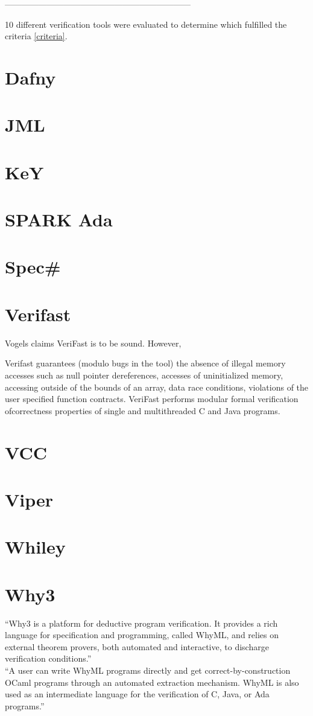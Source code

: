 \documentclass[12pt,openany,a4paper]{book}
\begin{document}
------------------------------------------------------------------

10 different verification tools were evaluated to determine which fulfilled the criteria \ref{criteria}.

\section {Dafny}
\section {JML}
\section {KeY}
\section {SPARK Ada}
\section {Spec\#}
\section {Verifast}
Vogels claims VeriFast is to be sound. However, 

Verifast guarantees (modulo bugs in the tool) the absence of illegal memory accesses such as null pointer dereferences, accesses of uninitialized memory, accessing outside of the bounds of an array, data race conditions, violations of the user specified function contracts.
VeriFast performs modular formal verification ofcorrectness properties of single and multithreaded C and Java programs. \\

\section {VCC}
\section {Viper}
\section {Whiley}
\section {Why3}
``Why3 is a platform for deductive program verification. It provides a rich language for
specification and programming, called WhyML, and relies on external theorem provers,
both automated and interactive, to discharge verification conditions.''\\
``A user can write WhyML programs directly and get correct-by-construction
OCaml programs through an automated extraction mechanism. WhyML is also used as
an intermediate language for the verification of C, Java, or Ada programs.''
\end{document}
